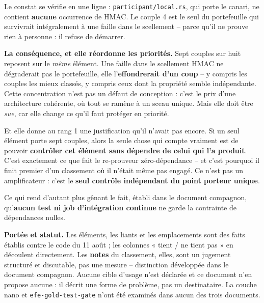 \documentclass[10pt]{article}
\newcommand{\code}[1]{\texttt{\small #1}}
\begin{document}
Le constat se vérifie en une ligne : \code{participant/local.rs}, qui porte le canari, ne contient
\textbf{aucune} occurrence de HMAC. Le couple 4 est le seul du portefeuille qui survivrait
intégralement à une faille dans le scellement -- parce qu'il ne prouve rien à personne : il refuse de
démarrer.

\begin{alerte}
\textbf{La conséquence, et elle réordonne les priorités.} Sept couples sur huit reposent sur le
\emph{même} élément. Une faille dans le scellement HMAC ne dégraderait pas le portefeuille, elle
l'\textbf{effondrerait d'un coup} -- y compris les couples les mieux classés, y compris ceux dont la
propriété semble indépendante. Cette concentration n'est pas un défaut de conception : c'est le prix
d'une architecture cohérente, où tout se ramène à un sceau unique. Mais elle doit être \emph{sue}, car
elle change ce qu'il faut protéger en priorité.
\end{alerte}

Et elle donne au rang 1 une justification qu'il n'avait pas encore. Si un seul élément porte sept
couples, alors la seule chose qui compte vraiment est de pouvoir \textbf{contrôler cet élément sans
dépendre de celui qui l'a produit}. C'est exactement ce que fait le re-prouveur zéro-dépendance -- et
c'est pourquoi il finit premier d'un classement où il n'était même pas engagé. Ce n'est pas un
amplificateur : c'est le \textbf{seul contrôle indépendant du point porteur unique}.

Ce qui rend d'autant plus gênant le fait, établi dans le document compagnon, qu'\textbf{aucun test ni
job d'intégration continue} ne garde la contrainte de dépendances nulles.

\begin{these}
\small\textbf{Portée et statut.} Les éléments, les liants et les emplacements sont des faits établis
contre le code du 11 août ; les colonnes « tient / ne tient pas » en découlent directement. Les
\textbf{notes} du classement, elles, sont un jugement structuré et discutable, pas une mesure --
distinction développée dans le document compagnon. Aucune cible d'usage n'est déclarée et ce document
n'en propose aucune : il décrit une forme de problème, pas un destinataire. La couche nano et
\code{efe-gold-test-gate} n'ont été examinés dans aucun des trois documents.
\end{these}
\end{document}
